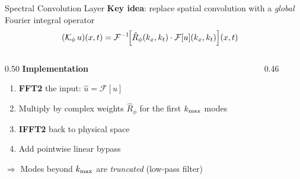 \documentclass[aspectratio=169,12pt]{beamer}
\begin{document}
\begin{frame}{Spectral Convolution Layer}
  \textbf{Key idea}: replace spatial convolution with a \textit{global} Fourier integral operator
  \begin{align}
    (\mathcal{K}_\phi\, u)(x,t)
    &= \mathcal{F}^{-1}\!\Bigl[\hat{R}_\phi(k_x, k_t)\cdot \mathcal{F}[u](k_x, k_t)\Bigr](x,t)
  \end{align}

  \begin{columns}[T]
    \begin{column}{0.50\textwidth}
      \textbf{Implementation}
      \begin{enumerate}
        \item \textbf{FFT2} the input: $\hat{u} = \mathcal{F}[u]$
        \item Multiply by complex weights $\hat{R}_\phi$ for the first $k_{\rm max}$ modes
        \item \textbf{IFFT2} back to physical space
        \item Add pointwise linear bypass
      \end{enumerate}
      \vspace{4pt}
      $\Rightarrow$ Modes beyond $k_{\rm max}$ are \textit{truncated} (low-pass filter)
    \end{column}
    \begin{column}{0.46\textwidth}
    \end{column}
  \end{columns}
\end{frame}

\end{document}
